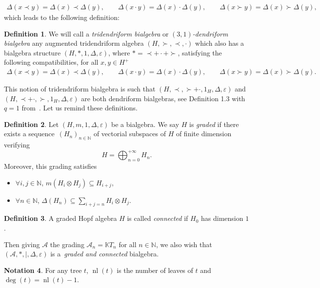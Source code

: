 \documentclass[10pt,a4paper]{amsart}
\numberwithin{equation}{section}
\theoremstyle{definition}
\newtheorem{defi}{Definition}[section]
\newtheorem{Not}[defi]{Notation}
\theoremstyle{plain}
\newcommand{\K}{\mathbb{K}}
\newcommand{\N}{\mathbb{N}}
\DeclareMathOperator{\nf}{nl}
\begin{document}
\begin{gather*}
	\Delta(x\prec y)=\Delta(x)\prec \Delta(y),\qquad \Delta(x\cdot y)=\Delta(x)\cdot\Delta(y),\qquad \Delta(x\succ y)=\Delta(x)\succ\Delta(y),	
\end{gather*}
which leads to the following definition:
\begin{defi}%
	We will call a \emph{tridendriform bialgebra} or \emph{$(3,1)$-dendriform bialgebra} any augmented tridendriform algebra $(H,\succ,\prec,\cdot)$ which also has a bialgebra structure $(H,*,1,\Delta,\varepsilon)$, where $*=\prec+\cdot+\succ$, satisfying the following compatibilities, for all $x,y\in H^+$
	\begin{gather*}
		\Delta(x\prec y)=\Delta(x)\prec \Delta(y),\qquad \Delta(x\cdot y)=\Delta(x)\cdot\Delta(y),\qquad \Delta(x\succ y)=\Delta(x)\succ\Delta(y).	
	\end{gather*}
\end{defi}

This notion of tridendriform bialgebra is such that $(H,\prec,\succ+\cdot,1_H,\Delta,\varepsilon)$ and $(H,\prec+\cdot,\succ,\allowbreak 1_H,\Delta,\varepsilon)$ are both dendriform bialgebras, see Definition 1.3 with $q=1$ from~\cite{Tridend}.
 Let us remind these definitions.

\begin{defi}\label{graded}
	Let $(H,m,1,\Delta,\varepsilon)$ be a bialgebra. We say $H$ is \emph{graded} if there exists a sequence~$(H_n)_{n\in\N}$ of vectorial subspaces of $H$ of finite dimension verifying
	\[
	H=\bigoplus_{n=0}^{+\infty}H_n.
	\]
	Moreover, this grading satisfies
	\begin{itemize}\itemsep=0pt
		\item $\forall i,j\in\N$, $m(H_i\otimes H_j)\subseteq H_{i+j}$,
		\item $\forall n\in\N$, $\Delta(H_n)\subseteq \sum_{i+j=n} H_i\otimes H_j$.
	\end{itemize}
\end{defi}

\begin{defi}\label{connected}
	A graded Hopf algebra $H$ is called \emph{connected} if $H_0$ has dimension $1$.
\end{defi}

Then giving $\mathcal{A}$ the grading $\mathcal{A}_n=\K T_n$ for all $n\in \N$, we also wish that $(\mathcal{A},*,|,\Delta,\varepsilon)$ is a~\emph{graded and connected} bialgebra.
\begin{Not}
	For any tree $t$, $\nf(t)$ is the number of leaves of $t$ and $\deg(t)=\nf(t)-1$.
\end{Not}
\end{document}
